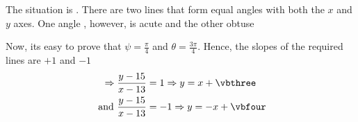\begin{solution}[\halfpage]
	The situation is \asif. There are two lines that form equal angles with both the $x$ and $y$ axes. One angle ,
    however, is acute and the other obtuse
    
    Now, its easy to prove that $\psi = \frac{\pi}{4}$ and $\theta = \frac{3\pi}{4}$. Hence, the slopes of the 
    required lines are $+1$ and $-1$
    \begin{align}
    	\Rightarrow \dfrac{y-\vbtwo}{x-\vbone} &= 1 \Rightarrow y = x + \vbthree\\
    	\text{ and } \dfrac{y-\vbtwo}{x-\vbone} &= -1 \Rightarrow y = -x + \vbfour
    \end{align}
\end{solution}
